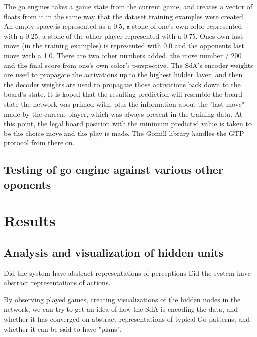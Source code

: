 \documentclass[12pt]{article}
\begin{document}
The go engines takes a game state from the current game, and creates a vector of floats from it in the same way that the dataset training examples were created. An empty space is represented as a 0.5, a stone of one's own color represented with a 0.25, a stone of the other player represented with a 0.75. Ones own last move (in the training examples) is represented with 0.0 and the opponents last move with a 1.0. There are two other numbers added. the move number / 200 and the final score from one's own color's perspective. The SdA's encoder weights are used to propagate the activations up to the highest hidden layer, and then the decoder weights are used to propagate those activations back down to the board's state. It is hoped that the resulting prediction will resemble the board state the network was primed with, plus the information about the "last move" made by the current player, which was always present in the training data. At this point, the legal board position with the minimum predicted value is taken to be the choice move and the play is made. The Gomill library handles the GTP protocol from there on.
	
	\subsection{Testing of go engine against various other oponents}
	

	
\section{Results}
	\subsection{Analysis and visualization of hidden units}
		Did the system have abstract representations of perceptions
		Did the system have abstract representations of actions.
		
By observing played games, creating visualizations of the hidden nodes in the network, we can try to get an idea of how the SdA is encoding the data, and whether it has converged on abstract representations of typical Go patterns, and whether it can be said to have "plans".
		
\end{document}
